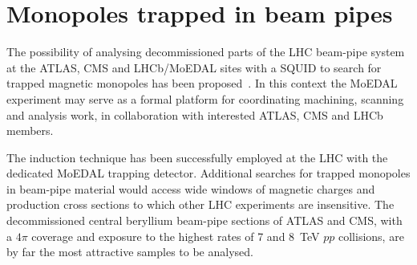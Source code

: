 \section{Monopoles trapped in beam pipes}\label{sc:pipes}

The possibility of analysing decommissioned parts of the LHC beam-pipe system at the ATLAS, CMS and LHCb/MoEDAL sites with a SQUID to search for trapped magnetic monopoles has been proposed~\cite{beampipe-proposal}. In this context the MoEDAL experiment may serve as a formal platform for coordinating machining, scanning and analysis work, in collaboration with interested ATLAS, CMS and LHCb members. 

The induction technique has been successfully employed at the LHC with the dedicated MoEDAL trapping detector. Additional searches for trapped monopoles in beam-pipe material would access wide windows of magnetic charges and production cross sections to which other LHC experiments are insensitive. The decommissioned central beryllium beam-pipe sections of ATLAS and CMS, with a $4\pi$ coverage and exposure to the highest rates of 7 and 8~TeV $pp$ collisions, are by far the most attractive samples to be analysed.
